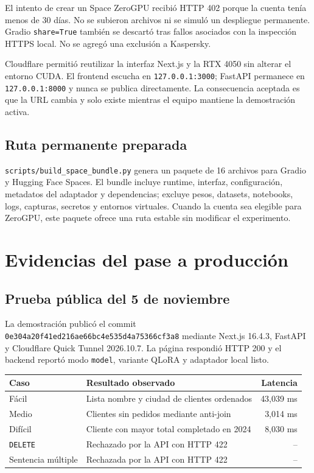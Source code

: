 \documentclass[11pt,letterpaper]{article}
\newcommand{\code}[1]{\texttt{#1}}
\begin{document}
El intento de crear un Space ZeroGPU recibió HTTP 402 porque la cuenta tenía menos de 30 días. No
se subieron archivos ni se simuló un despliegue permanente. Gradio \code{share=True} también se
descartó tras fallos asociados con la inspección HTTPS local. No se agregó una exclusión a Kaspersky.

Cloudflare permitió reutilizar la interfaz Next.js y la RTX 4050 sin alterar el entorno CUDA. El
frontend escucha en \code{127.0.0.1:3000}; FastAPI permanece en \code{127.0.0.1:8000} y nunca se
publica directamente. La consecuencia aceptada es que la URL cambia y solo existe mientras el equipo
mantiene la demostración activa.

\subsection{Ruta permanente preparada}

\code{scripts/build\_space\_bundle.py} genera un paquete de 16 archivos para Gradio y Hugging Face
Spaces. El bundle incluye runtime, interfaz, configuración, metadatos del adaptador y dependencias;
excluye pesos, datasets, notebooks, logs, capturas, secretos y entornos virtuales. Cuando la cuenta
sea elegible para ZeroGPU, este paquete ofrece una ruta estable sin modificar el experimento.

\section{Evidencias del pase a producción}

\subsection{Prueba pública del 5 de noviembre}

La demostración publicó el commit \code{0e304a20f41ed216ae66bc4e535d4a75366cf3a8} mediante
Next.js 16.4.3, FastAPI y Cloudflare Quick Tunnel 2026.10.7. La página respondió HTTP 200 y el backend
reportó modo \code{model}, variante QLoRA y adaptador local listo.

\begin{tabularx}{\textwidth}{@{}lXr@{}}
\toprule
\textbf{Caso} & \textbf{Resultado observado} & \textbf{Latencia}\\
\midrule
Fácil & Lista nombre y ciudad de clientes ordenados & 43,039 ms\\
Medio & Clientes sin pedidos mediante anti-join & 3,014 ms\\
Difícil & Cliente con mayor total completado en 2024 & 8,030 ms\\
\code{DELETE} & Rechazado por la API con HTTP 422 & --\\
Sentencia múltiple & Rechazada por la API con HTTP 422 & --\\
\bottomrule
\end{tabularx}
\end{document}

